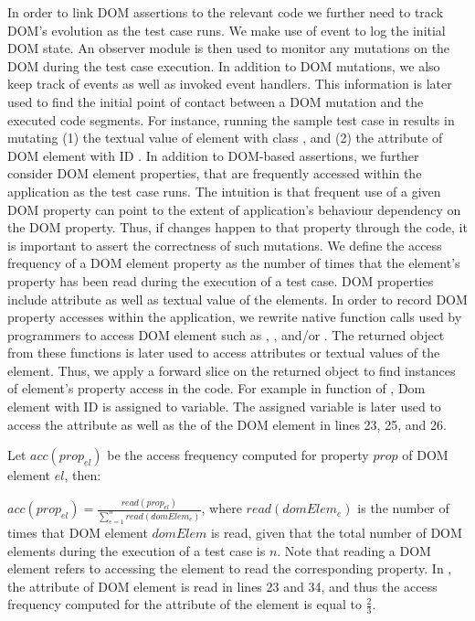 In order to link DOM assertions to the relevant \javascript code we further need to track DOM's evolution as the test case runs. We make use of  event to log the initial DOM state. An observer module is then used to monitor any mutations on the DOM during the test case execution. In addition to DOM mutations, we also keep track of \javascript events as well as invoked event handlers. This information is later used to find the initial point of contact between a DOM mutation and the executed code segments.
For instance, running the sample test case in  results in mutating (1) the textual value of  element with class , and (2) the  attribute of DOM element with ID .
In addition to DOM-based assertions, we further consider DOM element properties, that are frequently accessed within the application as the test case runs. The intuition is that frequent use of a given DOM property can point to the extent of application's behaviour dependency on the DOM property. Thus, if changes happen to that property through the \javascript code, it is important to assert the correctness of such mutations. We define the access frequency of a DOM element property as the number of times that the element's property has been read during the execution of a test case. DOM properties include attribute as well as textual value of the elements.
In order to record DOM property accesses within the application, we rewrite native function calls used by programmers to access DOM element such as , , and/or . The returned object from these functions is later used to access attributes or textual values of the element. Thus, we apply a forward slice on the returned object to find instances of element's property access in the code.
For example in function  of , Dom element with ID  is assigned to  variable. The assigned variable is later used to access the  attribute as well as the 
of the DOM element in lines 23, 25, and 26.

Let $acc(prop_{el})$ be the access frequency computed for property $prop$ of DOM element $el$, then:
 
$acc(prop_{el})=\frac{read(prop_{el})}{\sum _{e=1}^{n} read(domElem_e)}$, where $read(domElem_{e})$ is the number of times that DOM element $domElem$ is read, given that the total number of DOM elements during the execution of a test case is $n$.
Note that reading a DOM element refers to accessing the element to read the corresponding property. In , the  attribute of DOM element  is read in lines 23 and 34, and thus the access frequency
computed for the  attribute of the element is equal to $\frac{2}{3}$.

